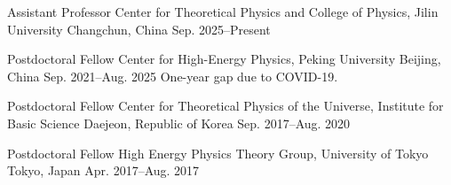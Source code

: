 \cventry
  {Assistant Professor}
  {Center for Theoretical Physics and College of Physics, Jilin University}
  {Changchun, China}
  {Sep. 2025--Present}
  {}

\cventry
  {Postdoctoral Fellow}
  {Center for High-Energy Physics, Peking University}
  {Beijing, China}
  {Sep. 2021--Aug. 2025}
  {{\small One-year gap due to COVID-19.}}

\cventry
  {Postdoctoral Fellow}
  {Center for Theoretical Physics of the Universe, Institute for Basic Science}
  {Daejeon, Republic of Korea}
  {Sep. 2017--Aug. 2020}
  {}

\cventry
  {Postdoctoral Fellow}
  {High Energy Physics Theory Group, University of Tokyo}
  {Tokyo, Japan}
  {Apr. 2017--Aug. 2017}
  {}